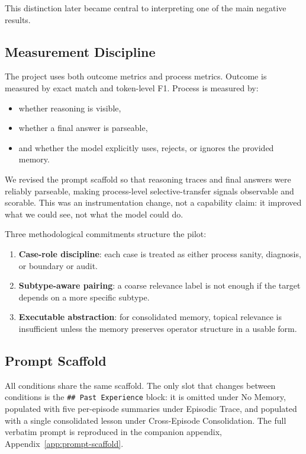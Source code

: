 \documentclass[11pt]{article}
\begin{document}
This distinction later became central to interpreting one of the main negative results.

\subsection{Measurement Discipline}

The project uses both outcome metrics and process metrics. Outcome is measured by exact match and token-level F1. Process is measured by:

\begin{itemize}
\item whether reasoning is visible,
\item whether a final answer is parseable,
\item and whether the model explicitly uses, rejects, or ignores the provided memory.
\end{itemize}

We revised the prompt scaffold so that reasoning traces and final answers were reliably parseable, making process-level selective-transfer signals observable and scorable. This was an instrumentation change, not a capability claim: it improved what we could see, not what the model could do.

Three methodological commitments structure the pilot:

\begin{enumerate}
\item \textbf{Case-role discipline}: each case is treated as either process sanity, diagnosis, or boundary or audit.
\item \textbf{Subtype-aware pairing}: a coarse relevance label is not enough if the target depends on a more specific subtype.
\item \textbf{Executable abstraction}: for consolidated memory, topical relevance is insufficient unless the memory preserves operator structure in a usable form.
\end{enumerate}

\subsection{Prompt Scaffold}

All conditions share the same scaffold. The only slot that changes between conditions is the \texttt{\#\# Past Experience} block: it is omitted under No Memory, populated with five per-episode summaries under Episodic Trace, and populated with a single consolidated lesson under Cross-Episode Consolidation. The full verbatim prompt is reproduced in the companion appendix, Appendix~\ref{app:prompt-scaffold}.
\end{document}
